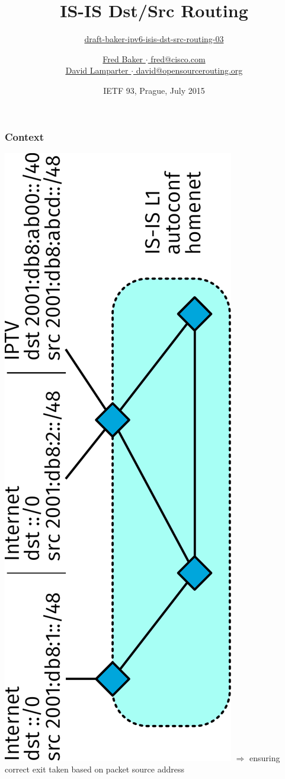 \documentclass[12pt]{beamer}
\title{IS-IS Dst/Src Routing}
\subtitle{%
  \href{https://datatracker.ietf.org/doc/draft-baker-ipv6-isis-dst-src-routing/}{draft-baker-ipv6-isis-dst-src-routing-03}
}
\author{%
\href{mailto:fred@cisco.com}{Fred Baker $\cdot$ fred@cisco.com}\\%
\underline{\href{mailto:david@opensourcerouting.org}{David Lamparter $\cdot$ david@opensourcerouting.org}}%
}
\date{IETF 93, Prague, July 2015}
\begin{document}
\begin{frame}
  \titlepage
\end{frame}

\begin{frame}
  \frametitle{Context}
  \includegraphics[scale=0.45,angle=-90]{intro_topo.pdf}%
  \vspace{5mm}
  $\Rightarrow$ ensuring correct exit taken based on packet source address
\end{frame}
\end{document}
